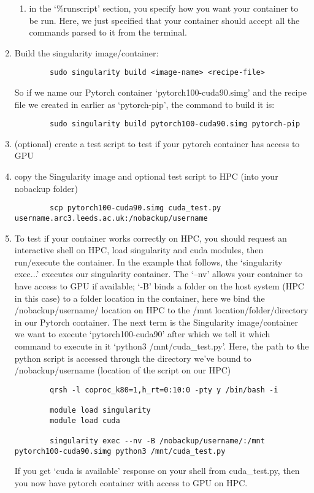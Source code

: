 \documentclass[]{article}
\begin{document}
\begin{enumerate}
\begin{enumerate}
		\item in the `\%runscript' section, you specify how you want your container to be run. Here, we just specified that your container should accept all the commands parsed to it from the terminal.
	\end{enumerate}
	\begin{minipage}{\textwidth}
		
	\end{minipage}
	\item Build the singularity image/container:
	\begin{lstlisting}
		sudo singularity build <image-name> <recipe-file>
	\end{lstlisting}
	So if we name our Pytorch container `pytorch100-cuda90.simg' and the recipe file we created in earlier as `pytorch-pip', the command to build it is:
	\begin{lstlisting}
		sudo singularity build pytorch100-cuda90.simg pytorch-pip
	\end{lstlisting}
	\item (optional) create a test script to test if your pytorch container has access to GPU
	
	\begin{minipage}{\textwidth}
		
	\end{minipage}
	\item copy the Singularity image and optional test script to HPC (into your nobackup folder)
	\begin{lstlisting}
		scp pytorch100-cuda90.simg cuda_test.py username.arc3.leeds.ac.uk:/nobackup/username
	\end{lstlisting}
	\item To test if your container works correctly on HPC, you should request an interactive shell on HPC, load singularity and cuda modules, then run/execute the container.
	In the example that follows, the `singularity exec...' executes our singularity container. The `--nv' allows your container to have access to GPU if available; `-B' binds a folder on the host system (HPC in this case) to a folder location in the container, here we bind the /nobackup/username/ location on HPC to the /mnt location/folder/directory in our Pytorch container. The next term is the Singularity image/container we want to execute `pytorch100-cuda90' after which we tell it which command to execute in it `python3 /mnt/cuda\_test.py'. Here, the path to the python script is accessed through the directory we've bound to /nobackup/username (location of the script on our HPC)
	\begin{minipage}{\linewidth}
		\begin{lstlisting}
		qrsh -l coproc_k80=1,h_rt=0:10:0 -pty y /bin/bash -i
		
		module load singularity
		module load cuda
		
		singularity exec --nv -B /nobackup/username/:/mnt pytorch100-cuda90.simg python3 /mnt/cuda_test.py
		\end{lstlisting}
	\end{minipage}
	If you get `cuda is available' response on your shell from cuda\_test.py, then you now have pytorch container with access to GPU on HPC.
\end{enumerate}
\end{document}
